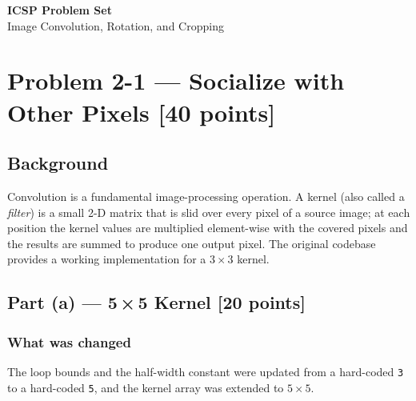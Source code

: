 \documentclass[12pt,a4paper]{article}
\begin{document}
\begin{center}
    {\LARGE \textbf{ICSP Problem Set}}\\[0.4em]
    {\large Image Convolution, Rotation, and Cropping}\\[1.2em]
\end{center}

\begin{center}
\end{center}

\bigskip
\tableofcontents
\newpage

\section{Problem 2-1 — Socialize with Other Pixels \textnormal{[40 points]}}

\subsection*{Background}
Convolution is a fundamental image-processing operation.
A kernel (also called a \emph{filter}) is a small 2-D matrix that is slid over
every pixel of a source image; at each position the kernel values are
multiplied element-wise with the covered pixels and the results are summed to
produce one output pixel.
The original codebase provides a working implementation for a
\(3\times 3\) kernel.

\subsection{Part (a) — \texorpdfstring{5\,×\,5}{5x5} Kernel \textnormal{[20 points]}}

\subsubsection*{What was changed}
The loop bounds and the half-width constant were updated from a hard-coded
\texttt{3} to a hard-coded \texttt{5}, and the kernel array was extended to
\(5\times 5\).
\end{document}
